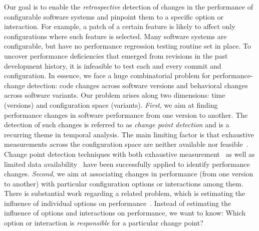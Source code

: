 \documentclass[sigconf]{acmart}
\begin{document}
	{\color{red}Our goal is to enable the \emph{retrospective} detection of changes in the performance of configurable software systems and pinpoint them to a specific option or interaction. For example, a patch of a certain feature is likely to affect only configurations where such feature is selected. Many software systems are configurable, but have no performance regression testing routine set in place. To uncover performance deficiencies that emerged from revisions in the past development history, it is infeasible to test each and every commit and configuration.} In essence, we face a huge combinatorial problem for performance-change detection: code changes across software versions and behavioral changes across software variants.
	Our problem arises along two dimensions: time (versions) and configuration space (variants).
	\emph{First}, we aim at finding performance changes in software performance from one version to another.
	The detection of such changes is referred to as \emph{change point detection} and is a recurring theme in temporal analysis.
	The main limiting factor is that exhaustive measurements across the configuration space are neither available nor feasible~\cite{white_selecting_2009}.
	Change point detection techniques with both exhaustive measurement~\cite{cityIdentifying2014,daly_industry_2020} as well as limited data availability~\cite{sandoval_alcocer_learning_2016,alcocer_prioritizing_2020,huang_performance_2014,muhlbauer_accurate_2019} have been successfully applied to identify performance changes.
	\emph{Second}, we aim at associating changes in performance (from one version to another) with particular configuration options or interactions among them.
	There is substantial work  regarding a related problem, which is estimating the influence of individual options on performance~\cite{siegmundPredictingPerformanceAutomated2012,siegmundPerformanceinfluenceModelsHighly2015,sarkarCostEfficientSamplingPerformance,haDeepPerf2019}. Instead of estimating the influence of options and interactions on performance, we want to know: Which option or interaction is \emph{responsible} for a particular change point?

\end{document}
